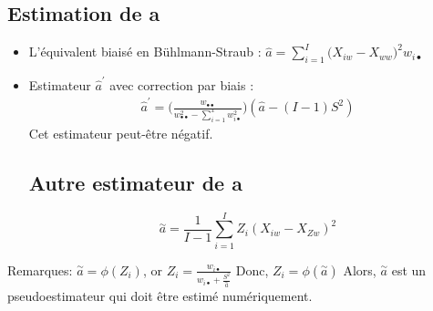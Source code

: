 \subsection{Estimation de a}
\begin{itemize}
\item L'équivalent biaisé en Bühlmann-Straub : $\widehat{a} = \sum_{i=1}^{I} \Big(X_{iw} - X_{ww} \Big)^2 w_{i \bullet} $
\item Estimateur $\widehat{a}^{'}$ avec correction par biais : 
\begin{align*}
\widehat{a}^{'} = \Big( \frac{w_{\bullet \bullet}}{w_{\bullet \bullet}^2 - \sum_{i=1}^{x} w_{i \bullet}^2}\Big) (\widehat{a} - (I -1)S^2) 
\end{align*}
Cet estimateur peut-être négatif.\\
\subsection{Autre estimateur de a}
\begin{equation}
\overset{\sim}{a} = \frac{1}{I - 1} \sum_{i = 1}^{I} Z_i (X_{iw}-X_{Zw})^2
\end{equation}
\end{itemize}
Remarques:
$\overset{\sim}{a} = \phi(Z_i)$, or $Z_i = \frac{w_{i\bullet}}{w_{i\bullet} + \frac{S^2}{\overset{\sim}{a}}}$
Donc,
$Z_i = \phi(\overset{\sim}{a})$
Alors, $\overset{\sim}{a}$ est un pseudoestimateur qui doit être estimé numériquement.
